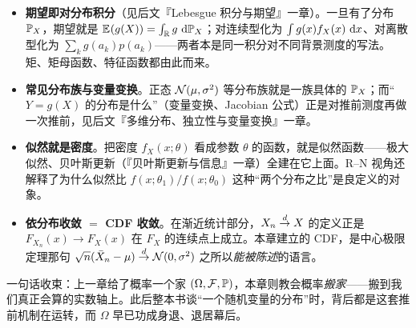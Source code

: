 \begin{itemize}
    \item \textbf{期望即对分布积分}（见后文『Lebesgue 积分与期望』一章）。一旦有了分布 $\mathbb{P}_X$，期望就是 $\mathbb{E}_{}\!\left(g(X)\right)=\int_{\mathbb{R}} g\,\mathop{}\!\mathrm{d}\mathbb{P}_X$；对连续型化为 $\int g(x)f_X(x)\,\mathop{}\!\mathrm{d} x$、对离散型化为 $\sum_k g(a_k)p(a_k)$——两者本是同一积分对不同背景测度的写法。矩、矩母函数、特征函数都由此而来。
    \item \textbf{常见分布族与变量变换}。正态 $\mathcal{N}(\mu,\sigma^2)$ 等分布族就是一族具体的 $\mathbb{P}_X$；而``$Y=g(X)$ 的分布是什么''（变量变换、Jacobian 公式）正是对推前测度再做一次推前，见后文『多维分布、独立性与变量变换』一章。
    \item \textbf{似然就是密度}。把密度 $f_X(x;\theta)$ 看成参数 $\theta$ 的函数，就是似然函数——极大似然、贝叶斯更新（『贝叶斯更新与信息』一章）全建在它上面。R--N 视角还解释了为什么似然比 $f(x;\theta_1)/f(x;\theta_0)$ 这种``两个分布之比''是良定义的对象。
    \item \textbf{依分布收敛 $=$ CDF 收敛}。在渐近统计部分，$X_n\overset{d}{\to} X$ 的定义正是 $F_{X_n}(x)\to F_X(x)$ 在 $F_X$ 的连续点上成立。本章建立的 CDF，是中心极限定理那句 $\sqrt{n}(\bar X_n-\mu)\overset{d}{\to}\mathcal{N}(0,\sigma^2)$ 之所以\emph{能被陈述}的语言。
\end{itemize}

一句话收束：上一章给了概率一个家 $(\Omega,\mathcal{F},\mathbb{P})$，本章则教会概率\emph{搬家}——搬到我们真正会算的实数轴上。此后整本书谈``一个随机变量的分布''时，背后都是这套推前机制在运转，而 $\Omega$ 早已功成身退、退居幕后。
